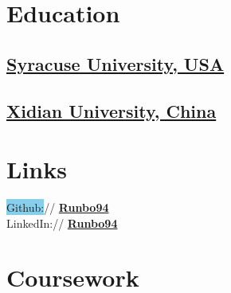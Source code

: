 \documentclass[letterpaper]{deedy-resume} %
\begin{document}
\begin{minipage}[t]{0.33\textwidth} %


\section{Education} 

\subsection{\href{https://www.syracuse.edu/}{Syracuse University, USA}}


\sectionspace %



\subsection{\href{http://en.xidian.edu.cn/}{Xidian University, China}}

\sectionspace %


\section{Links} 

\colorbox{SkyBlue}{Github:}// \href{https://github.com/runbo94}{\bf Runbo94} \\
LinkedIn:// \href{https://www.linkedin.com/in/runbo94}{\bf Runbo94} \\

\sectionspace %


\section{Coursework}


\end{minipage}
\end{document}
